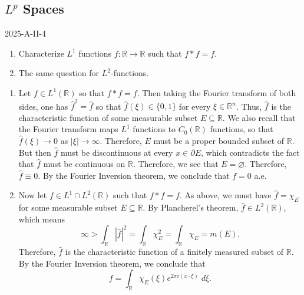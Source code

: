 \documentclass{article}
\begin{document}
	\subsection{\texorpdfstring{$L^p$}{Lp} Spaces}
	
	\begin{prb}{2025-A-II-4}
		$ $\newline \vspace{-0.65cm}
		\begin{enumerate}[itemsep =-2pt,label = (\roman{*})]
			\item Characterize $L^1$ functions $f: \mathbb{R} \to \mathbb{R}$ such that $f \ast f = f$. 
			\item The same question for $L^2$-functions. 
		\end{enumerate}
	\end{prb}
	\begin{enumerate}[itemsep =-2pt,label =(\roman{*})]
		\item Let $f \in L^1(\mathbb{R})$ so that $f \ast f = f$. Then taking the Fourier transform of both sides, one has $\hat{f}^2 = \hat{f}$ so that $\hat{f}(\xi) \in \{0,1\}$ for every $\xi \in \mathbb{R}^n$. Thus, $\hat{f}$ is the characteristic function of some measurable subset $E \subseteq \mathbb{R}$. We also recall that the Fourier transform maps $L^1$ functions to $C_0(\mathbb{R})$ functions, so that $\hat{f}(\xi) \to 0$ as $|\xi| \to \infty$. Therefore, $E$ must be a proper bounded subset of $\mathbb{R}$. But then $\hat{f}$ must be discontinuous at every $x \in \partial E$, which contradicts the fact that $\hat{f}$ must be continuous on $\mathbb{R}$. Therefore, we see that $E = \varnothing$. Therefore, $\hat{f} \equiv 0$. By the Fourier Inversion theorem, we conclude that $f = 0$ a.e. 
		\item Now let $f \in L^1 \cap L^2(\mathbb{R})$ such that $f \ast f = f$. As above, we must have $\hat{f} = \chi_E$ for some measurable subset $E \subseteq\mathbb{R}$. By Plancherel's theorem, $\hat{f} \in L^2(\mathbb{R})$, which means 
		\begin{equation*}
			\infty > \int_{\mathbb{R}}|\hat{f}|^2 = \int_{\mathbb{R}}\chi_E^2 = \int_{\mathbb{R}}\chi_E = m(E). 
		\end{equation*}
		Therefore, $\hat{f}$ is the characteristic function of a finitely measured subset of $\mathbb{R}$. By the Fourier Inversion theorem, we conclude that
		\begin{equation*}
			f = \int_{\mathbb{R}}\chi_E(\xi)e^{2\pi i (x \cdot \xi)}\;d\xi. 
		\end{equation*}
	\end{enumerate}
	
\end{document}
